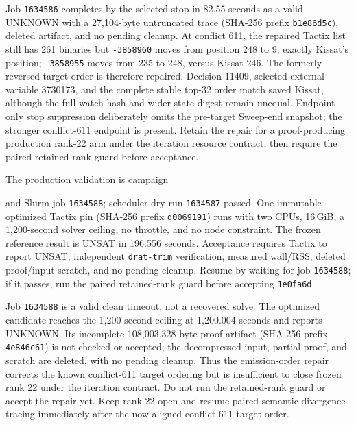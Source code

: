 \documentclass[11pt]{article}
\newcommand{\code}[1]{\texttt{#1}}
\newcommand{\artifact}[1]{\path{#1}}
\begin{document}
Job \code{1634586} completes by the selected stop in 82.55 seconds as a valid
UNKNOWN with a 27,104-byte untruncated trace (SHA-256 prefix
\code{b1e86d5c}), deleted artifact, and no pending cleanup. At conflict 611,
the repaired Tactix list still has 261 binaries but \code{-3858960} moves from
position 248 to 9, exactly Kissat's position; \code{-3858955} moves from 235
to 248, versus Kissat 246. The formerly reversed target order is therefore
repaired. Decision 11409, selected external variable 3730173, and the complete
stable top-32 order match saved Kissat, although the full watch hash and wider
state digest remain unequal. Endpoint-only stop suppression deliberately omits
the pre-target Sweep-end snapshot; the stronger conflict-611 endpoint is
present. Retain the repair for a proof-producing production rank-22 arm under
the iteration resource contract, then require the paired retained-rank guard
before acceptance.

The production validation is campaign
\begin{center}\small\artifact{20260819-1031-tierd-rank22-production}\end{center}
and Slurm job \code{1634588}; scheduler dry run \code{1634587} passed. One
immutable optimized Tactix pin (SHA-256 prefix \code{d0069191}) runs with two
CPUs, 16\,GiB, a 1,200-second solver ceiling, no throttle, and no node
constraint. The frozen reference result is UNSAT in 196.556 seconds. Acceptance
requires Tactix to report UNSAT, independent \code{drat-trim} verification,
measured wall/RSS, deleted proof/input scratch, and no pending cleanup. Resume
by waiting for job \code{1634588}; if it passes, run the paired retained-rank
guard before accepting \code{1e0fa6d}.

Job \code{1634588} is a valid clean timeout, not a recovered solve. The
optimized candidate reaches the 1,200-second ceiling at 1,200.004 seconds and
reports UNKNOWN. Its incomplete 108,003,328-byte proof artifact (SHA-256 prefix
\code{4e846c61}) is not checked or accepted; the decompressed input, partial
proof, and scratch are deleted, with no pending cleanup. Thus the
emission-order repair corrects the known conflict-611 target ordering but is
insufficient to close frozen rank 22 under the iteration contract. Do not run
the retained-rank guard or accept the repair yet. Keep rank 22 open and resume
paired semantic divergence tracing immediately after the now-aligned
conflict-611 target order.
\end{document}

